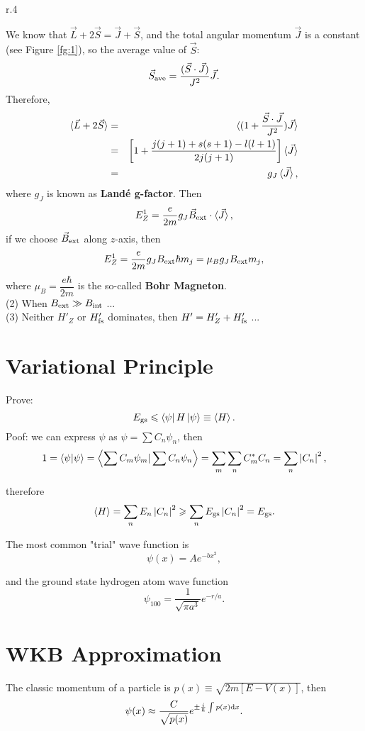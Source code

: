 \documentclass[12pt, 
]{article}
\begin{document}
\begin{wrapfigure}{r}{.4\textwidth}
\hspace{0.8cm}
\caption{$\vec{J}=\vec{L}+\vec{S}$ is a constant.}
\label{fg:1}
\end{wrapfigure}

\noindent We know that $\vec{L}+2\vec{S}=\vec{J}+\vec{S}$, and the total angular momentum $\vec{J}$ is a constant (see Figure \ref{fg:1}), so the average value of $\vec{S}$:
\[
	\vec{S}_{\rm ave}=\frac{(\vec{S}\cdot\vec{J})}{J^2}\vec{J}.
\]
Therefore,
\begin{eqnarray*}
	\braket{\vec{L}+2\vec{S}}&=&\braket{(1+\frac{\vec{S}\cdot\vec{J}}{J^2})\vec{J}}\\
	&=&\left[1+\frac{j(j+1)+s(s+1)-l(l+1)}{2j(j+1)}\right]\braket{\vec{J}}\\
	&=&g_J\braket{\vec{J}},
\end{eqnarray*}
where $g_J$ is known as {\bf Land\'{e} g-factor}.
Then
\[
	E^1_Z=\frac{e}{2m}g_J\vec{B}_{\rm ext}\cdot\braket{\vec{J}},
\]
if we choose $\vec{B}_{\rm ext}$ along $z$-axis, then
\[
	E_Z^1=\frac{e}{2m}g_JB_{\rm ext}\hbar m_j=\mu_B g_JB_{\rm ext}m_j,
\]
where $\mu_B=\dfrac{e\hbar}{2m}$ is the so-called {\bf Bohr Magneton}.\\

\noindent (2) When $B_{\rm ext}\gg B_{\rm int}$ ...\\

\noindent (3) Neither $H'_Z$ or $H'_{\rm fs}$ dominates, then $H'=H'_Z+H'_{\rm fs}$ ...
\newpage

\section{Variational Principle}
Prove:
\[	
	E_{\rm gs}\leqslant\bra{\psi}H\ket{\psi}\equiv\braket{H}.
\]
Poof: we can express $\psi$ as $\psi=\sum C_n\psi_n$, then
\[
	1=\braket{\psi|\psi}=\left<\sum C_m\psi_m|\sum C_n\psi_n\right>=\sum_m\sum_n C_m^*C_n=\sum_n\left|C_n\right|^2,
\]

therefore
\[
	\braket{H}=\sum_nE_n\left|C_n\right|^2\geqslant\sum_nE_{\rm gs}\left|C_n\right|^2=E_{\rm gs}.
\]

The most common "trial" wave function is
\[
	\psi(x)=Ae^{-bx^2},
\]

and the ground state hydrogen atom wave function
\[
	\psi_{100}=\frac{1}{\sqrt{\pi a^3}}e^{-r/a}.
\]

\section{WKB Approximation}
The classic momentum of a particle is $p(x)\equiv\sqrt{2m[E-V(x)]}$, then
\[
	\psi(x)\approx\frac{C}{\sqrt{p(x)}}e^{\pm\frac{i}{\hbar}\int p(x){\rm d}x}.
\]
\end{document}
